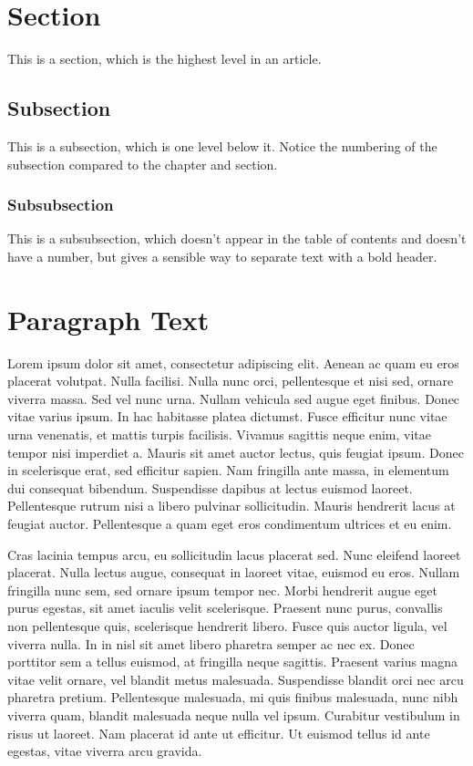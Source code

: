 \section{Section}
This is a section, which is the highest level in an article.

\subsection{Subsection}
This is a subsection, which is one level below it. Notice the numbering of the subsection compared to the chapter and section.

\subsubsection{Subsubsection}
This is a subsubsection, which doesn't appear in the table of contents and doesn't have a number, but gives a sensible way to separate text with a bold header.

\section{Paragraph Text}

Lorem ipsum dolor sit amet, consectetur adipiscing elit. Aenean ac quam eu eros placerat volutpat. Nulla facilisi. Nulla nunc orci, pellentesque et nisi sed, ornare viverra massa. Sed vel nunc urna. Nullam vehicula sed augue eget finibus. Donec vitae varius ipsum. In hac habitasse platea dictumst. Fusce efficitur nunc vitae urna venenatis, et mattis turpis facilisis. Vivamus sagittis neque enim, vitae tempor nisi imperdiet a. Mauris sit amet auctor lectus, quis feugiat ipsum. Donec in scelerisque erat, sed efficitur sapien. Nam fringilla ante massa, in elementum dui consequat bibendum. Suspendisse dapibus at lectus euismod laoreet. Pellentesque rutrum nisi a libero pulvinar sollicitudin. Mauris hendrerit lacus at feugiat auctor. Pellentesque a quam eget eros condimentum ultrices et eu enim.

Cras lacinia tempus arcu, eu sollicitudin lacus placerat sed. Nunc eleifend laoreet placerat. Nulla lectus augue, consequat in laoreet vitae, euismod eu eros. Nullam fringilla nunc sem, sed ornare ipsum tempor nec. Morbi hendrerit augue eget purus egestas, sit amet iaculis velit scelerisque. Praesent nunc purus, convallis non pellentesque quis, scelerisque hendrerit libero. Fusce quis auctor ligula, vel viverra nulla. In in nisl sit amet libero pharetra semper ac nec ex. Donec porttitor sem a tellus euismod, at fringilla neque sagittis. Praesent varius magna vitae velit ornare, vel blandit metus malesuada. Suspendisse blandit orci nec arcu pharetra pretium. Pellentesque malesuada, mi quis finibus malesuada, nunc nibh viverra quam, blandit malesuada neque nulla vel ipsum. Curabitur vestibulum in risus ut laoreet. Nam placerat id ante ut efficitur. Ut euismod tellus id ante egestas, vitae viverra arcu gravida.

